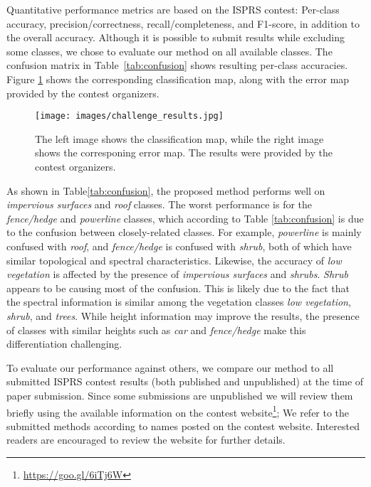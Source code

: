 \documentclass[final,3p,times,twocolumn,authoryear]{elsarticle}
\begin{document}
Quantitative performance metrics are based on the ISPRS contest: Per-class accuracy, precision/correctness, recall/completeness, and F1-score, in addition to the overall accuracy. 
Although it is possible to submit results while excluding some classes, we chose to evaluate our method on all available classes. 
The confusion matrix in Table~\ref{tab:confusion} shows resulting per-class accuracies.
Figure \ref{fig:results&rg} shows the corresponding classification map, along with the error map provided by the contest organizers. 
\begin{figure}[t]
\begin{center}
\texttt{[image: images/challenge\_results.jpg]}
\end{center}
\caption{The left image shows the classification map, while the right image shows the corresponing error map. The results were provided by the contest organizers.}
\label{fig:results&rg}
\end{figure}
As shown in Table\ref{tab:confusion}, the proposed method performs well on {\it impervious surfaces} and {\it roof} classes. 
The worst performance is for the {\it fence/hedge} and {\it powerline} classes, which according to Table \ref{tab:confusion} is due to the confusion between closely-related classes. 
For example, {\it powerline} is mainly confused with {\it roof}, and {\it fence/hedge} is confused with {\it shrub}, both of which have similar topological and spectral characteristics. 
Likewise, the accuracy of {\it low vegetation} is affected by the presence of {\it impervious surfaces} and {\it shrubs}. 
{\it Shrub} appears to be causing most of the confusion. 
This is likely due to the fact that the spectral information is similar among the vegetation classes {\it low vegetation}, {\it shrub}, and {\it trees}. 
While height information may improve the results, the presence of classes with similar heights such as {\it car} and {\it fence/hedge} make this differentiation challenging. 

To evaluate our performance against others, we compare our method to all submitted ISPRS contest results (both published and unpublished) at the time of paper submission. 
Since some submissions are unpublished we will review them briefly using the available information on the contest website\footnote{\url{https://goo.gl/6iTj6W}};  
We refer to the submitted methods according to names posted on the contest website. 
Interested readers are encouraged to review the website for further details. 
\end{document}
